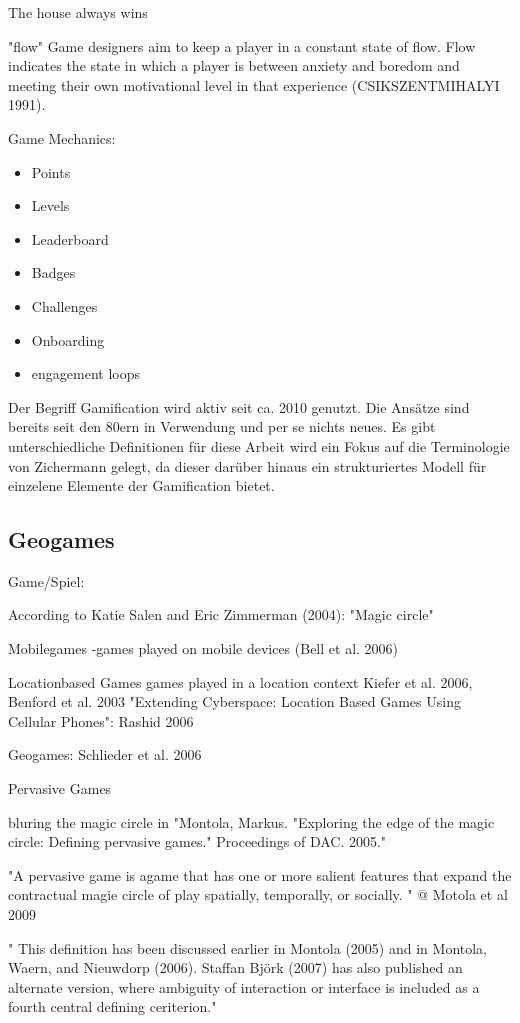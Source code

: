 The house always wins

"flow"
Game designers aim to
keep a player in a constant state of flow. Flow indicates the state in which a player is between
anxiety and boredom and meeting their own motivational level in that experience
(CSIKSZENTMIHALYI 1991).

Game Mechanics:
\begin{itemize}
      \item Points
      \item Levels
      \item Leaderboard
      \item Badges
      \item Challenges
      \item Onboarding
      \item engagement loops
\end{itemize}

Der Begriff Gamification wird aktiv seit ca. 2010 genutzt. Die Ansätze sind bereits seit den 80ern in Verwendung und per se nichts neues.
Es gibt unterschiedliche Definitionen für diese Arbeit wird ein Fokus auf die Terminologie von Zichermann gelegt, da dieser darüber hinaus ein strukturiertes Modell für einzelene Elemente der Gamification bietet.

\subsection{Geogames}
\label{subsec:S3_Geogames}

Game/Spiel:

According to  Katie  Salen  and  Eric  Zimmerman  (2004): "Magic circle"

Mobilegames
-games played on mobile devices (Bell et al. 2006)

Locationbased Games
games played in a location context
Kiefer et al. 2006, Benford et al. 2003
"Extending Cyberspace: Location Based Games Using Cellular Phones":
Rashid 2006

Geogames:
Schlieder et al. 2006

Pervasive Games

bluring the magic circle in "Montola, Markus. "Exploring the edge of the magic circle: Defining pervasive games." Proceedings of DAC. 2005."

"A pervasive game is agame that has one or more salient features that expand the 
contractual magie circle of play spatially, temporally, or socially. " @ Motola et al 2009

" This   definition   has   been   discussed   earlier  in   Montola   (2005)   and   in   Montola,   Waern,   and 
Nieuwdorp  (2006).  Staffan  Björk  (2007)  has  also  published  an  alternate version,  where  ambiguity 
of  interaction or  interface is  included  as  a  fourth  central  defining ceriterion." 

